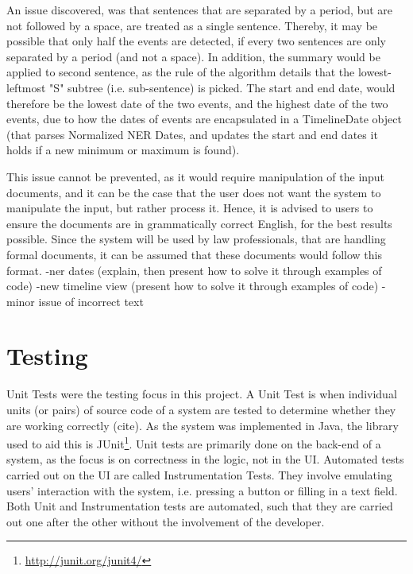 \par An issue discovered, was that sentences that are separated by a period, but are not followed by a space, are treated as a single sentence. Thereby, it may be possible that only half the events are detected, if every two sentences are only separated by a period (and not a space). In addition, the summary would be applied to second sentence, as the rule of the algorithm details that the lowest-leftmost "S" subtree (i.e. sub-sentence) is picked. The start and end date, would therefore be the lowest date of the two events, and the highest date of the two events, due to how the dates of events are encapsulated in a TimelineDate object (that parses Normalized NER Dates, and updates the start and end dates it holds if a new minimum or maximum is found).

\par This issue cannot be prevented, as it would require manipulation of the input documents, and it can be the case that the user does not want the system to manipulate the input, but rather process it. Hence, it is advised to users to ensure the documents are in grammatically correct English, for the best results possible. Since the system will be used by law professionals, that are handling formal documents, it can be assumed that these documents would follow this format.
-ner dates (explain, then present how to solve it through examples of code)
-new timeline view (present how to solve it through examples of code)
-minor issue of incorrect text

\section{Testing}
\par Unit Tests were the testing focus in this project. A Unit Test is when individual units (or pairs) of source code of a system are tested to determine whether they are working correctly (cite). As the system was implemented in Java, the library used to aid this is JUnit\footnote{\url{http://junit.org/junit4/}}. Unit tests are primarily done on the back-end of a system, as the focus is on correctness in the logic, not in the UI. Automated tests carried out on the UI are called Instrumentation Tests. They involve emulating users' interaction with the system, i.e. pressing a button or filling in a text field. Both Unit and Instrumentation tests are automated, such that they are carried out one after the other without the involvement of the developer.


